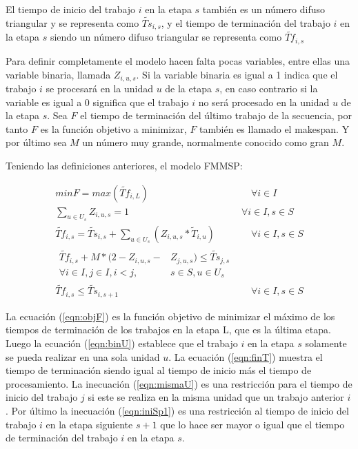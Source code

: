 \documentclass{article}
\begin{document}
\vspace{\baselineskip}
El tiempo de inicio del trabajo $i$ en la etapa $s$ también es un número difuso triangular y se representa como $\widetilde{Ts}_{i,s}$, y el tiempo de terminación del trabajo $i$ en la etapa $s$ siendo un número difuso triangular se representa como $\widetilde{Tf}_{i,s}$

\vspace{\baselineskip}
Para definir completamente el modelo hacen falta pocas variables, entre ellas una variable binaria, llamada $Z_{i,u,s}$. Si la variable binaria es igual a 1 indica que el trabajo $i$ se procesará en la unidad $u$ de la etapa $s$, en caso contrario si la variable es igual a 0 significa que el trabajo $i$ no será procesado en la unidad $u$ de la etapa $s$. Sea $F$ el tiempo de terminación del último trabajo de la secuencia, por tanto $F$ es la función objetivo a minimizar, $F$ también es llamado el makespan. Y por último sea $M$ un número muy grande, normalmente conocido como gran $M$.

\pagebreak

\vspace{\baselineskip}
Teniendo las definiciones anteriores, el modelo FMMSP:

\begin{align}
    \label{eqn:objF}
    min F = max(\widetilde{Tf}_{i,L}) &\quad\forall i \in I\\
    \label{eqn:binU}
    \sum_{u \in U_{s}} Z_{i,u,s} = 1 \qquad
    \qquad\quad &\forall i \in I, s \in S\\
    \label{eqn:finT}
    \widetilde{Tf}_{i,s} = \widetilde{Ts}_{i,s} + \sum_{u \in U_{s}}
    (Z_{i,u,s}*\tilde{T}_{i,u}) &\quad\forall i \in I, s \in S\\
    \begin{split}
        \label{eqn:mismaU}
        \widetilde{Tf}_{i,s} + M*(2-Z_{i,u,s}-&Z_{j,u,s}) \leq 
        \widetilde{Ts}_{j,s} \\
        \forall i \in I, j \in I, i < j,& s \in S, u \in U_{s}    
    \end{split}\\
    \label{eqn:iniSp1}
    \widetilde{Tf}_{i,s} \leq \widetilde{Ts}_{i,s+1} &\quad\forall i \in I,s \in S
\end{align}

La ecuación (\ref{eqn:objF}) es la función objetivo de minimizar el máximo de los tiempos de terminación de los trabajos en la etapa L, que es la última etapa. Luego la ecuación (\ref{eqn:binU}) establece que el trabajo $i$ en la etapa $s$ solamente se pueda realizar en una sola unidad $u$. La ecuación (\ref{eqn:finT}) muestra el tiempo de terminación siendo igual al tiempo de inicio más el tiempo de procesamiento. La inecuación (\ref{eqn:mismaU}) es una restricción para el tiempo de inicio del trabajo $j$ si este se realiza en la misma unidad que un trabajo anterior $i$. Por último la inecuación (\ref{eqn:iniSp1}) es una restricción al tiempo de inicio del trabajo $i$ en la etapa siguiente $s+1$ que lo hace ser mayor o igual que el tiempo de terminación del trabajo $i$ en la etapa $s$. \autocite{modFMMSP}
\end{document}
